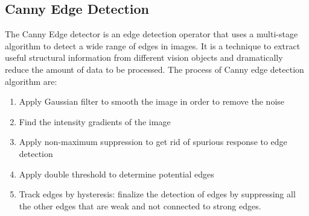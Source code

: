     \subsection{ Canny Edge Detection}
The Canny Edge detector is an edge detection operator that uses a multi-stage algorithm to detect a wide range of edges in images. It is a technique to extract useful structural information from different vision objects and dramatically reduce the amount of data to be processed. The process of Canny edge detection algorithm are:
        \begin{enumerate}
        \item Apply Gaussian filter to smooth the image in order to remove the noise
        \item Find the intensity gradients of the image
        \item Apply non-maximum suppression to get rid of spurious response to edge detection
        \item Apply double threshold to determine potential edges
        \item Track edges by hysteresis: finalize the detection of edges by suppressing all the other edges that are weak and not connected to strong edges.
        \end{enumerate}
